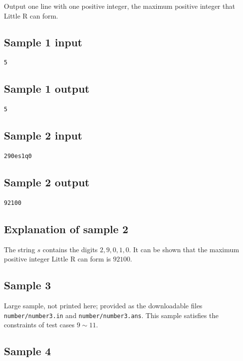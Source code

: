 \documentclass[11pt]{article}
\begin{document}
Output one line with one positive integer,
the maximum positive integer that Little R can form.

\subsection*{Sample 1 input}
\begin{verbatim}
5
\end{verbatim}

\subsection*{Sample 1 output}
\begin{verbatim}
5
\end{verbatim}

\subsection*{Sample 2 input}
\begin{verbatim}
290es1q0
\end{verbatim}

\subsection*{Sample 2 output}
\begin{verbatim}
92100
\end{verbatim}

\subsection*{Explanation of sample 2}

The string $s$ contains the digits $2, 9, 0, 1, 0$.
It can be shown that the maximum positive integer Little R can form is
$92100$.

\subsection*{Sample 3}

Large sample, not printed here;
provided as the downloadable files \texttt{number/number3.in} and \texttt{number/number3.ans}.
This sample satisfies the constraints of test cases $9 \sim 11$.

\subsection*{Sample 4}
\end{document}
